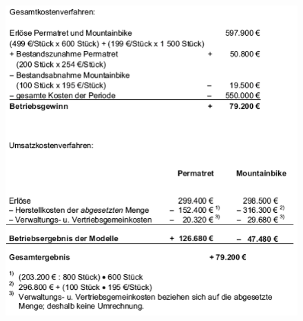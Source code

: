 \documentclass[a4paper,11pt, twoside]{article}
\begin{document}
\begin{figure}[h]
 \begin{center}
   \includegraphics[scale=0.5]{bilder/beispiel_betriebsergebnisrechnung2.png}
 \end{center}
\end{figure}
\end{document}
